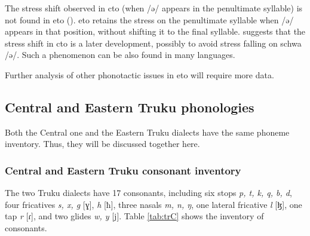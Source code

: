 The stress shift observed in \acl{cto} (when /ə/ appears in the penultimate syllable) is not found in \acl{eto} (\cite[96--97]{lee2015tawsa}). \acl{eto} retains the stress on the penultimate syllable when /ə/ appears in that position, without shifting it to the final syllable. \textcite[97]{lee2015tawsa} suggests that the stress shift in \acl{cto} is a later development, possibly to avoid stress falling on schwa /ə/. Such a phenomenon can be also found in many languages.

Further analysis of other phonotactic issues in \acl{eto} will require more data.

\subsection{Central and Eastern Truku phonologies}
Both the Central one and the Eastern Truku dialects have the same phoneme inventory. Thus, they will be discussed together here. 

\subsubsection{Central and Eastern Truku consonant inventory}

The two Truku dialects have 17 consonants, including six stops \textit{p, t, k, q, b, d}, four fricatives \textit{s, x, g} [ɣ], \textit{h} [ħ], three nasals \textit{m, n, ŋ}, one lateral fricative \textit{l} [ɮ], one tap \textit{r} [ɾ], and two glides \textit{w, y} [j]. Table \ref{tab:trC} shows the inventory of consonants.

